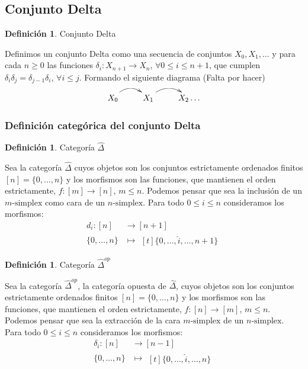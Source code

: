 \documentclass[11pt,a4paper,openright,oneside]{article}
\numberwithin{equation}{section}
\theoremstyle{definition}
\newtheorem{defi}[teo]{Definici\'on}
\begin{document}
\subsection{Conjunto Delta}
\begin{defi}
    Conjunto Delta
\end{defi}
Definimos un conjunto Delta como una secuencia de conjuntos $X_0,X_1,\dots$ y para cada $n\ge 0$ las funciones $\delta_i: X_{n+1} \longrightarrow X_n$, $\forall 0\le i \le n+1$, que cumplen $\delta_i\delta_j = \delta_{j-1}\delta_{i}$, $\forall i\le j$.
Formando el siguiente diagrama (Falta por hacer)

$$ %
    \xymatrix{
    X_0  \ar@/{}^{1pc}/[r]  & X_1  \ar@/{}^{1pc}/[r] & X_2  \dots
    }
$$

\subsubsection{Definici\'on categ\'orica del conjunto Delta}
\begin{defi}
    Categor\'ia $\hat{\Delta}$
\end{defi}
Sea la categor\'ia $\hat{\Delta}$ cuyos objetos son los conjuntos estrictamente ordenados finitos $[n] = \{0,\dots,n\}$ y los morfismos son las funciones, que mantienen el orden estrictamente, $f: [m] \longrightarrow [n]$, $m\le n$. Podemos pensar que sea la inclusi\'on de un $m\text{-simplex}$ como cara de un $n\text{-simplex}$.
Para todo $0\le i \le n$ consideramos los morfismos:
\begin{align*}
    d_i: [n]      & \longrightarrow [n+1] \\
    \{0,\dots,n\} & \longmapsto\!
    \begin{aligned}[t]
        \{0,\dots, \hat{i}, \dots,n+1\}
    \end{aligned}
\end{align*}

\begin{defi}
    Categor\'ia $\hat{\Delta}^{op}$
\end{defi}
Sea la categor\'ia $\hat{\Delta}^{op}$, la categor\'ia opuesta de $\hat{\Delta}$, cuyos objetos son los conjuntos estrictamente ordenados finitos $[n] = \{0,\dots,n\}$ y los morfismos son las funciones, que mantienen el orden estrictamente, $f: [n] \longrightarrow [m]$, $m\le n$. Podemos pensar que sea la extracci\'on de la cara $m\text{-simplex}$ de un $n\text{-simplex}$.
Para todo $0\le i \le n$ consideramos los morfismos:
\begin{align*}
    \delta_i: [n] & \longrightarrow [n-1] \\
    \{0,\dots,n\} & \longmapsto\!
    \begin{aligned}[t]
        \{0,\dots, \hat{i}, \dots,n\}
    \end{aligned}
\end{align*}
\end{document}
